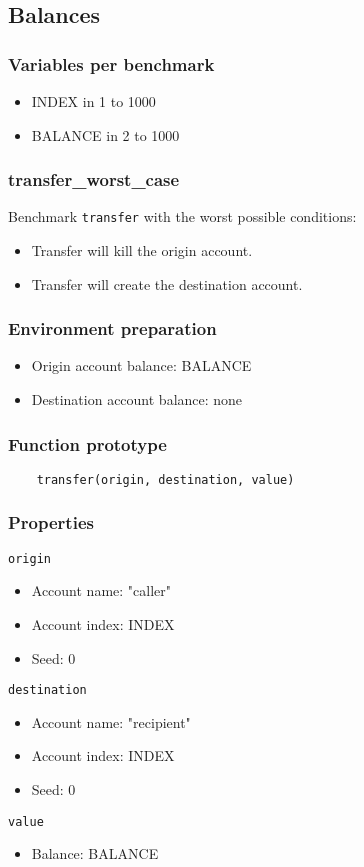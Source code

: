 \documentclass[11pt,a4paper]{article}
\begin{document}
\subsection{Balances}

\subsubsection*{Variables per benchmark}
\begin{itemize}
\item INDEX in 1 to 1000
\item BALANCE in 2 to 1000
\end{itemize}

\subsubsection{transfer\_worst\_case}

Benchmark \verb|transfer| with the worst possible conditions:
\begin{itemize}
\item Transfer will kill the origin account.
\item Transfer will create the destination account.
\end{itemize}

\subsubsection*{Environment preparation}
\begin{itemize}
\item Origin account balance: BALANCE
\item Destination account balance: none
\end{itemize}

\subsubsection*{Function prototype}
\begin{verbatim}
    transfer(origin, destination, value)
\end{verbatim}

\subsubsection*{Properties}
\verb|origin|
\begin{itemize}
\item Account name: "caller"
\item Account index: INDEX
\item Seed: 0
\end{itemize}
\verb|destination|
\begin{itemize}
\item Account name: "recipient"
\item Account index: INDEX
\item Seed: 0
\end{itemize}
\verb|value|
\begin{itemize}
\item Balance: BALANCE
\end{itemize}
\end{document}
